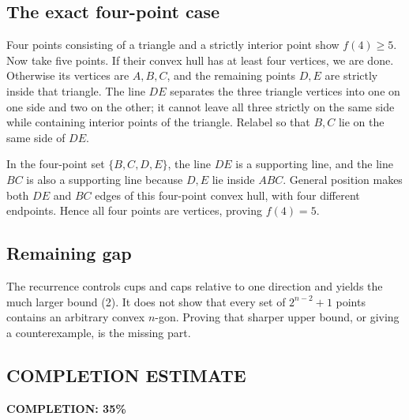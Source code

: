\subsection*{The exact four-point case}
Four points consisting of a triangle and a strictly interior point show $f(4)\ge5$. Now take five points. If their convex hull has at least four vertices, we are done. Otherwise its vertices are $A,B,C$, and the remaining points $D,E$ are strictly inside that triangle. The line $DE$ separates the three triangle vertices into one on one side and two on the other; it cannot leave all three strictly on the same side while containing interior points of the triangle. Relabel so that $B,C$ lie on the same side of $DE$.

In the four-point set $\{B,C,D,E\}$, the line $DE$ is a supporting line, and the line $BC$ is also a supporting line because $D,E$ lie inside $ABC$. General position makes both $DE$ and $BC$ edges of this four-point convex hull, with four different endpoints. Hence all four points are vertices, proving $f(4)=5$.

\subsection*{Remaining gap}
The recurrence controls cups and caps relative to one direction and yields the much larger bound (2). It does not show that every set of $2^{n-2}+1$ points contains an arbitrary convex $n$-gon. Proving that sharper upper bound, or giving a counterexample, is the missing part.
\subsection*{COMPLETION ESTIMATE}
\textbf{COMPLETION: 35\%}
